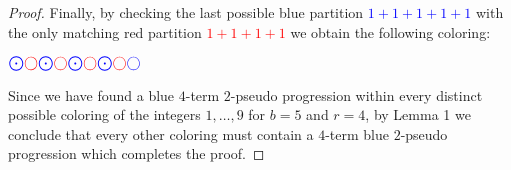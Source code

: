 \documentclass[ fontsize=10pt,twoside]{scrartcl}	%
\begin{document}
\begin{proof}
Finally, by checking the last possible blue partition \textcolor{blue}{$1+1+1+1+1$} with the only matching red partition \textcolor{red}{$1+1+1+1$} we obtain the following coloring:
\begin{center}
$\textcolor{blue}{\bigodot}\textcolor{red}{\bigcirc}\textcolor{blue}{\bigodot}\textcolor{red}{\bigcirc}\textcolor{blue}{\bigodot}\textcolor{red}{\bigcirc}\textcolor{blue}{\bigodot}\textcolor{red}{\bigcirc}\textcolor{blue}{\bigcirc}$
\end{center}
Since we have found a blue $4$-term $2$-pseudo progression within every distinct possible coloring of the integers $1,\ldots,9$ for $b=5$ and $r=4$, by Lemma 1 we conclude that every other coloring must contain a $4$-term blue $2$-pseudo progression which completes the proof.
\end{proof}

\end{document}
